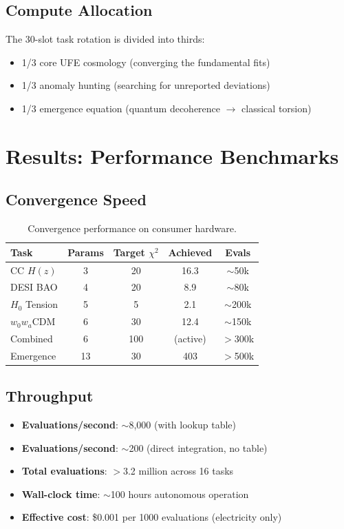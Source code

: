 \documentclass[twocolumn,showpacs,preprintnumbers,amsmath,amssymb,prl]{revtex4-2}
\begin{document}
\subsection{Compute Allocation}

The 30-slot task rotation is divided into thirds:
\begin{itemize}
\item 1/3 core UFE cosmology (converging the fundamental fits)
\item 1/3 anomaly hunting (searching for unreported deviations)
\item 1/3 emergence equation (quantum decoherence $\to$ classical torsion)
\end{itemize}

\section{Results: Performance Benchmarks}

\subsection{Convergence Speed}

\begin{table}[h]
\caption{Convergence performance on consumer hardware.}
\begin{ruledtabular}
\begin{tabular}{lcccc}
Task & Params & Target $\chi^2$ & Achieved & Evals \\
\hline
CC $H(z)$ & 3 & 20 & 16.3 & $\sim$50k \\
DESI BAO & 4 & 20 & 8.9 & $\sim$80k \\
$H_0$ Tension & 5 & 5 & 2.1 & $\sim$200k \\
$w_0 w_a$CDM & 6 & 30 & 12.4 & $\sim$150k \\
Combined & 6 & 100 & (active) & $>$300k \\
Emergence & 13 & 30 & 403 & $>$500k \\
\end{tabular}
\end{ruledtabular}
\label{tab:convergence}
\end{table}

\subsection{Throughput}

\begin{itemize}
\item \textbf{Evaluations/second}: $\sim$8,000 (with lookup table)
\item \textbf{Evaluations/second}: $\sim$200 (direct integration, no table)
\item \textbf{Total evaluations}: $>$3.2 million across 16 tasks
\item \textbf{Wall-clock time}: $\sim$100 hours autonomous operation
\item \textbf{Effective cost}: \$0.001 per 1000 evaluations (electricity only)
\end{itemize}
\end{document}
